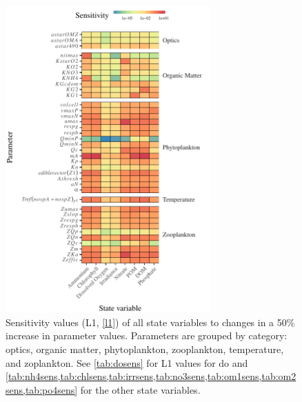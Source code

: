 \documentclass[preprint]{elsarticle}\usepackage[]{graphicx}\usepackage[]{color}
\begin{document}
\begin{figure}[!ht]

{\centering \includegraphics[width=0.7\textwidth]{figs/sensalltile-1} 

}

\caption{Sensitivity values (L1, \cref{l1}) of all state variables to changes in a 50\% increase in parameter values. Parameters are grouped by category: optics, organic matter, phytoplankton, zooplankton, temperature, and zoplankton.  See \cref{tab:dosens} for L1 values for \ac{do} and \cref{tab:nh4sens,tab:chlsens,tab:irrsens,tab:no3sens,tab:om1sens,tab:om2sens,tab:po4sens} for the other state variables.}\label{fig:sensalltile}
\end{figure}
\end{document}
